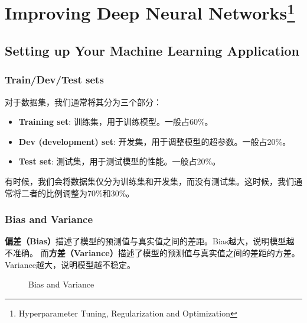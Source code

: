 \chapter[Improving Deep Neural Networks]{Improving Deep Neural Networks\setcounter{footnote}{0}\footnote{Hyperparameter Tuning, Regularization and Optimization}}

\section{Setting up Your Machine Learning Application}

\subsection{Train/Dev/Test sets}
对于数据集，我们通常将其分为三个部分：
\begin{itemize}
    \item \textbf{Training set}: 训练集，用于训练模型。一般占60\%。
    \item \textbf{Dev (development) set}: 开发集，用于调整模型的超参数。一般占20\%。
    \item \textbf{Test set}: 测试集，用于测试模型的性能。一般占20\%。
\end{itemize}
有时候，我们会将数据集仅分为训练集和开发集，而没有测试集。这时候，我们通常将二者的比例调整为70\%和30\%。

\subsection{Bias and Variance}
\textbf{偏差（Bias）}描述了模型的预测值与真实值之间的差距。Bias越大，说明模型越不准确。
而\textbf{方差（Variance）}描述了模型的预测值与真实值之间的差距的方差。Variance越大，说明模型越不稳定。
\begin{figure}[h!bt]
    \centering
    \centering
    \caption{Bias and Variance}
    \label{fig:bias-variance}
\end{figure}

